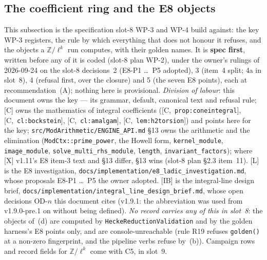 \documentclass[11pt]{article}
\theoremstyle{remark}
\newcommand{\Z}{\mathbb{Z}}
\newcommand{\HA}[1]{[C,~\texttt{#1}]}      %
\begin{document}
\subsection{The coefficient ring and the E8 objects}\label{sec:ring}
This subsection is the specification slot-8 WP-3 and WP-4 build against: the key WP-3 registers,
the rule by which everything that does not honour it refuses, and the objects a $\Z/\ell^k$ run
computes, with their golden names. It is \textbf{spec first}, written before any of it is coded
(slot-8 plan WP-2), under the owner's rulings of 2026-09-24 on the slot-8 decisions~2 (E8-P1
\ldots~P5 adopted), 3 (item~4 split; 4a in slot~8), 4 (refusal first, over the closure) and 5
(the seven E8 points), each at recommendation~(A); nothing here is provisional.
\emph{Division of labour}: this document owns the key --- its grammar, default, canonical text
and refusal rule; [C] owns the mathematics of integral coefficients (\HA{prop:coneintegral},
\HA{cl:bockstein}, \HA{cl:amalgam}, \HA{lem:h2torsion}) and points here for the key;
\texttt{src/ModArithmetic/ENGINE\_API.md} \S13 owns the arithmetic and the elimination
(\texttt{ModCtx::prime\_power}, the Howell form, \texttt{kernel\_module}, \texttt{image\_module},
\texttt{solve\_multi\_rhs\_module}, \texttt{length}, \texttt{invariant\_factors}); where [X]
v1.11's E8 item-3 text and \S13 differ, \S13 wins (slot-8 plan \S2.3 item~11). [L] is the E8
investigation, \texttt{docs/implementation/e8\_ladic\_investigation.md}, whose proposals E8-P1
\ldots~P5 the owner adopted. [IB] is the integral-line design brief,
\texttt{docs/implementation/integral\_line\_design\_brief.md}, whose open decisions OD-$n$ this
document cites (v1.9.1: the abbreviation was used from v1.9.0-pre.1 on without being defined). \emph{No record carries any of this in slot~8}: the objects of~(d) are
computed by \texttt{HeckeReductionValidation} and by the golden harness's E8 points only, and are
console-unreachable (rule R19 refuses \texttt{golden()} at a non-zero fingerprint, and the
pipeline verbs refuse by~(b)). Campaign rows and record fields for $\Z/\ell^k$ come with C5, in
slot~9.
\end{document}
